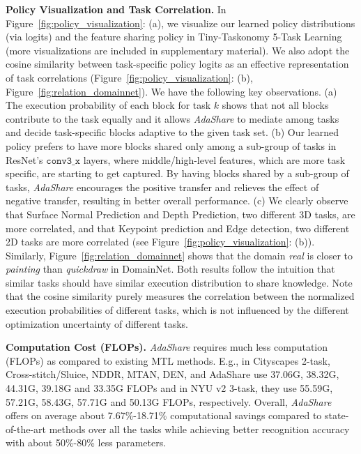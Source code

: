 \noindent\textbf{Policy Visualization and Task Correlation.}
In Figure~\ref{fig:policy_visualization}: (a), we visualize our learned policy distributions (via logits) and the feature sharing policy in Tiny-Taskonomy 5-Task Learning (more visualizations are included in supplementary material). We also adopt the cosine similarity between task-specific policy logits as an effective representation of task correlations (Figure~\ref{fig:policy_visualization}: (b), Figure~\ref{fig:relation_domainnet}).
We have the following key observations. (a) The execution probability of each block for task $k$ shows that not all blocks contribute to the task equally and it allows \textit{AdaShare} to mediate among tasks and decide task-specific blocks adaptive to the given task set. (b) Our learned policy prefers to have more blocks shared only among a sub-group of tasks in ResNet's $\mathtt{conv3\_x}$ layers, where middle/high-level features, which are more task specific, are starting to get captured. By having blocks shared by a sub-group of tasks, \textit{AdaShare} encourages the positive transfer and relieves the effect of negative transfer, resulting in better overall performance. (c) We clearly observe that Surface Normal Prediction and Depth Prediction, two different 3D tasks, are more correlated, and that Keypoint prediction and Edge detection, two different 2D tasks are more correlated (see Figure~\ref{fig:policy_visualization}: (b)). Similarly, Figure~\ref{fig:relation_domainnet} shows that the domain \textit{real} is closer to \textit{painting} than \textit{quickdraw} in DomainNet. Both results follow the intuition that similar tasks should have similar execution distribution to share knowledge. 
Note that the cosine similarity purely measures the correlation between the normalized execution probabilities of different tasks, which is not influenced by the different optimization uncertainty of different tasks.


\noindent\textbf{Computation Cost (FLOPs).}
\textit{AdaShare} requires much less computation (FLOPs) as compared to existing MTL methods. E.g., in Cityscapes 2-task, Cross-stitch/Sluice, NDDR, MTAN, DEN, and AdaShare use 37.06G, 38.32G, 44.31G, 39.18G and 33.35G FLOPs and in NYU v2 3-task, they use 55.59G, 57.21G, 58.43G, 57.71G and 50.13G FLOPs, respectively. Overall, \textit{AdaShare} offers on average about 7.67\%-18.71\% computational savings compared to state-of-the-art methods over all the tasks while achieving better recognition accuracy with about 50\%-80\% less parameters.

